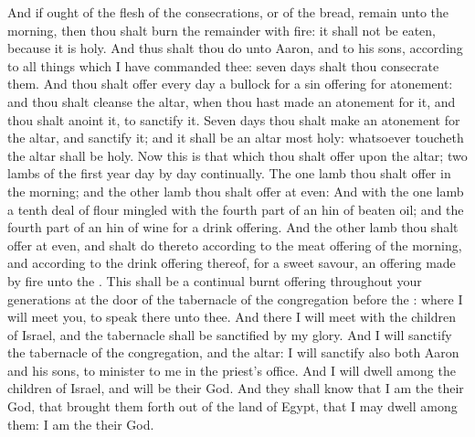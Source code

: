 \begin{biblechapter}
\verse And if ought of the flesh of the consecrations, or of the bread, remain unto the morning, then thou shalt burn the remainder with fire: it shall not be eaten, because it is holy.
\verse And thus shalt thou do unto Aaron, and to his sons, according to all things which I have commanded thee: seven days shalt thou consecrate them.
\verse And thou shalt offer every day a bullock for a sin offering for atonement: and thou shalt cleanse the altar, when thou hast made an atonement for it, and thou shalt anoint it, to sanctify it.
\verse Seven days thou shalt make an atonement for the altar, and sanctify it; and it shall be an altar most holy: whatsoever toucheth the altar shall be holy.
\verse Now this is that which thou shalt offer upon the altar; two lambs of the first year day by day continually.
\verse The one lamb thou shalt offer in the morning; and the other lamb thou shalt offer at even:
\verse And with the one lamb a tenth deal of flour mingled with the fourth part of an hin of beaten oil; and the fourth part of an hin of wine for a drink offering.
\verse And the other lamb thou shalt offer at even, and shalt do thereto according to the meat offering of the morning, and according to the drink offering thereof, for a sweet savour, an offering made by fire unto the \LORD.
\verse This shall be a continual burnt offering throughout your generations at the door of the tabernacle of the congregation before the \LORD: where I will meet you, to speak there unto thee.
\verse And there I will meet with the children of Israel, and the tabernacle shall be sanctified by my glory.
\verse And I will sanctify the tabernacle of the congregation, and the altar: I will sanctify also both Aaron and his sons, to minister to me in the priest's office.
\verse And I will dwell among the children of Israel, and will be their God.
\verse And they shall know that I am the \LORD their God, that brought them forth out of the land of Egypt, that I may dwell among them: I am the \LORD their God.
\end{biblechapter}

